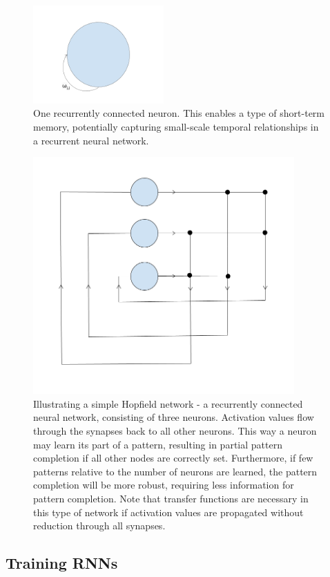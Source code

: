 \begin{figure}
\centering
\includegraphics[width=5cm]{fig/one_recurrent_neuron}
\caption{One recurrently connected neuron. This enables a type of short-term memory, potentially capturing small-scale temporal relationships in a recurrent neural network.}
\label{fig:one_recurrent_neuron}
\end{figure}

\begin{figure}
\centering
\includegraphics[width=10cm]{fig/hopfield_net}
\caption{Illustrating a simple Hopfield network - a recurrently connected neural network, consisting of three neurons. Activation values flow through the synapses back to all other neurons. This way a neuron may learn its part of a pattern, resulting in partial pattern completion if all other nodes are correctly set. Furthermore, if few patterns relative to the number of neurons are learned, the pattern completion will be more robust, requiring less  information for pattern completion. Note that transfer functions are necessary in this type of network if activation values are propagated without reduction through all synapses.}
\label{fig:hopfield_net}
\end{figure}

\subsection{Training RNNs}

